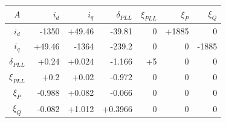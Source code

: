 \begin{tabular}{crrrrrr}\toprule
$A$ & $i_d$ & $i_q$ & $\delta_{PLL}$ & $\xi_{PLL}$ & $\xi_{P}$ & $\xi_{Q}$\\\midrule
$i_d$ & -1350 & +49.46 & -39.81 & 0 & +1885 & 0\\
$i_q$ & +49.46 & -1364 & -239.2 & 0 & 0 & -1885\\
$\delta_{PLL}$ & +0.24 & +0.024 & -1.166 & +5 & 0 & 0\\
$\xi_{PLL}$ & +0.2 & +0.02 & -0.972 & 0 & 0 & 0\\
$\xi_{P}$ & -0.988 & +0.082 & -0.066 & 0 & 0 & 0\\
$\xi_{Q}$ & -0.082 & +1.012 & +0.3966 & 0 & 0 & 0\\
\bottomrule
\end{tabular}
